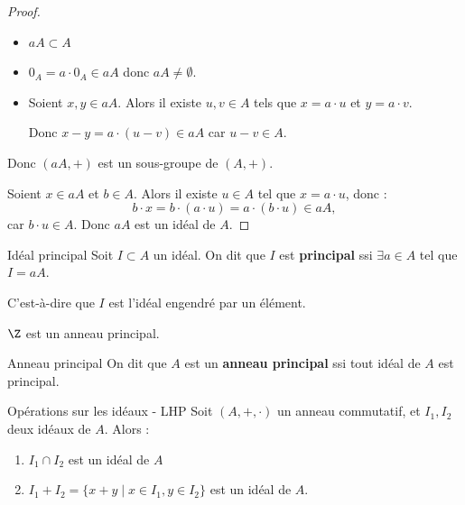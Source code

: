 \begin{proof}~\\
    \begin{itemize}
        \item $aA \subset A$ 
        \item $0_A = a \cdot 0_A \in aA$ donc $aA \neq \emptyset$.
        \item Soient $x, y \in aA$. Alors il existe $u, v \in A$ tels que $x = a \cdot u$ et $y = a \cdot v$.
        
        Donc $x - y = a \cdot (u - v) \in aA$ car $u - v \in A$.

    \end{itemize}

    Donc $(aA, +)$ est un sous-groupe de $(A, +)$.

    Soient $x \in aA$ et $b \in A$. Alors il existe $u \in A$ tel que $x = a \cdot u$, donc :
    \[b \cdot x = b \cdot (a \cdot u) = a \cdot (b \cdot u) \in aA,\]
    car $b \cdot u \in A$.
    Donc $aA$ est un idéal de $A$.
\end{proof}

\begin{definition}{Idéal principal}{}
    Soit $I \subset A$ un idéal. On dit que $I$
    est \textbf{principal} ssi $\exists a \in A$ tel que $I = aA$.

    C'est-à-dire que $I$ est l'idéal engendré par un élément.
\end{definition}

\begin{exemple}
    $\Z$ est un anneau principal.
\end{exemple}

\begin{definition}{Anneau principal}{}
    On dit que $A$ est un \textbf{anneau principal} ssi tout
    idéal de $A$ est principal.
\end{definition}

\begin{proposition}{Opérations sur les idéaux - LHP}{}
    Soit $(A, +, \cdot)$ un anneau commutatif, et $I_1, I_2$ deux idéaux de $A$. Alors :
    \begin{enumerate}
        \item $I_1 \cap I_2$ est un idéal de $A$
        \item $I_1 + I_2 = \{x + y \mid x \in I_1, y \in I_2\}$ est un idéal de $A$.
    \end{enumerate}
\end{proposition}


